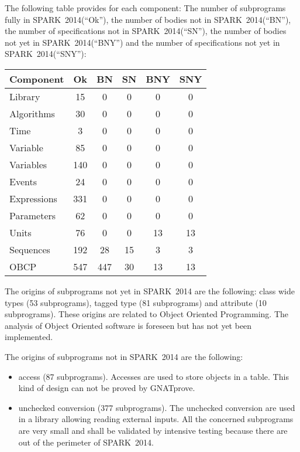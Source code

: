 \documentclass[10pt,a4paper,twocolumn]{article}
\newcommand{\gnatprove}{GNATprove\xspace}
\newcommand{\newspark}{SPARK~2014\xspace}
\begin{document}
The following table provides for each component:
The number of subprograms fully in \newspark (``Ok''),
the number of bodies not in \newspark (``BN''),
the number of specifications not in \newspark (``SN''),
the number of bodies not yet in \newspark (``BNY'') and
the number of specifications not yet in \newspark (``SNY''):

\vspace{5mm}

\begin{tabular}{|l|c|c|c|c|c|}
\hline
Component   & Ok  & BN  & SN & BNY & SNY \\
\hline
Library     &  15 &   0 &  0 &   0 &   0 \\
\hline
Algorithms  &  30 &   0 &  0 &   0 &   0 \\
\hline
Time        &   3 &   0 &  0 &   0 &   0 \\
\hline
Variable    &  85 &   0 &  0 &   0 &   0 \\
\hline
Variables   & 140 &   0 &  0 &   0 &   0 \\
\hline
Events      &  24 &   0 &  0 &   0 &   0 \\
\hline
Expressions & 331 &   0 &  0 &   0 &   0 \\
\hline
Parameters  &  62 &   0 &  0 &   0 &   0 \\
\hline
Units       &  76 &   0 &  0 &  13 &  13 \\
\hline
Sequences   & 192 &  28 & 15 &   3 &   3 \\
\hline
OBCP        & 547 & 447 & 30 &  13 &  13 \\
\hline
\end{tabular}

\vspace{5mm}

The origins of subprograms not yet in \newspark are the following:
class wide types (53 subprograms),
tagged type (81 subprograms) and
attribute (10 subprograms).
These origins are related to Object Oriented Programming. The analysis of Object Oriented software is foreseen but has not yet been implemented.

The origins of subprograms not in \newspark are the following:

\begin{itemize}
\item access (87 subprograms).
      Accesses are used to store objects in a table.
      This kind of design can not be proved by \gnatprove.
\item unchecked conversion (377 subprograms).
      The unchecked conversion are used in a library allowing reading external inputs.
      All the concerned subprograms are very small and shall be validated by intensive testing because there are out of the perimeter of \newspark.
\end{itemize}
\end{document}
